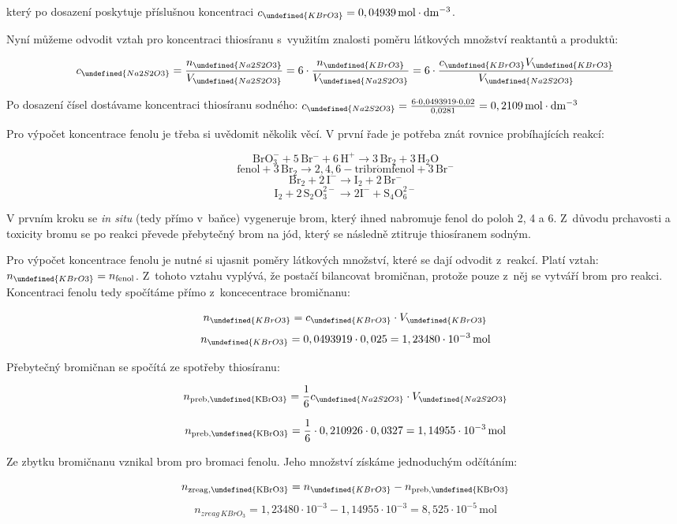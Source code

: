 \documentclass{book}
\let\ch\undefined
\begin{document}
který po dosazení poskytuje příslušnou koncentraci $c_{\ch{KBrO3}}=0,04939\,\mathrm{mol\cdot dm^{-3}}$.

Nyní můžeme odvodit vztah pro koncentraci thiosíranu s~využitím znalosti poměru látkových
množství reaktantů a produktů:

\[
c_{\ch{Na2S2O3}}=\frac{n_{\ch{Na2S2O3}}}{V_{\ch{Na2S2O3}}}=6\cdot\frac{n_{\ch{KBrO3}}}{V_{\ch{Na2S2O3}}}=6\cdot\frac{c_{\ch{KBrO3}}V_{\ch{KBrO3}}}{V_{\ch{Na2S2O3}}}
\]

Po dosazení čísel dostávame koncentraci thiosíranu sodného: $c_{\ch{Na2S2O3}}=\frac{6\cdot0,0493919\cdot0,02}{0,0281}=0,2109\,\mathrm{mol\cdot dm^{-3}}$

Pro výpočet koncentrace fenolu je třeba si uvědomit několik věcí.
V první řade je potřeba znát rovnice probíhajících reakcí: 

\[
\mathrm{BrO_{3}^{-}+5\,Br^{-}+6\,H^{+}\rightarrow3\,Br_{2}+3\,H_{2}O}
\]
\[
\mathrm{fenol+3\,Br_{2}\rightarrow2,4,6-tribr\acute{o}mfenol+3\,Br^{-}}
\]
\[
\mathrm{Br_{2}+2\,I^{-}\rightarrow I_{2}+2\,Br^{-}}
\]
\[
\mathrm{I_{2}+2\,S_{2}O_{3}^{2-}\rightarrow2I^{-}+S_{4}O_{6}^{2-}}
\]

V prvním kroku se \textit{in situ} (tedy přímo v~baňce) vygeneruje brom, který
ihned nabromuje fenol do poloh 2, 4 a 6. Z~důvodu prchavosti a toxicity
bromu se po reakci převede přebytečný brom na jód, který se následně
ztitruje thiosíranem sodným. 

Pro výpočet koncentrace fenolu je nutné si ujasnit poměry látkových
množství, které se dají odvodit z~reakcí. Platí vztah: $n_{\ch{KBrO3}}=n_{\mathrm{fenol}}$.
Z~tohoto vztahu vyplývá, že postačí bilancovat bromičnan, protože pouze z~něj se vytváří brom pro reakci. Koncentraci fenolu tedy spočítáme přímo z~koncecentrace bromičnanu:

\[
n_{\ch{KBrO3}}=c_{\ch{KBrO3}}\cdot V_{\ch{KBrO3}}
\]
\[
n_{\ch{KBrO3}}=0,0493919\cdot0,025=1,23480\cdot10^{-3}\,\mathrm{mol}
\]

Přebytečný bromičnan se spočítá ze spotřeby thiosíranu: 

\[
n_{\mathrm{preb,\ch{KBrO3}}}=\frac{1}{6}c_{\ch{Na2S2O3}}\cdot V_{\ch{Na2S2O3}}
\]

\[
n_{\mathrm{preb,\ch{KBrO3}}}=\frac{1}{6}\cdot0,210926\cdot0,0327=1,14955\cdot10^{-3}\,\mathrm{mol}
\]

Ze zbytku bromičnanu vznikal brom pro bromaci fenolu. Jeho množství
získáme jednoduchým odčítáním: 

\[
n_{\mathrm{zreag,\ch{KBrO3}}}=n_{\ch{KBrO3}}-n_{\mathrm{preb,\ch{KBrO3}}}
\]
\[
n_{zreag\,KBrO_{3}}=1,23480\cdot10^{-3}-1,14955\cdot10^{-3}=8,525\cdot10^{-5}\,\mathrm{mol}
\]
\end{document}
